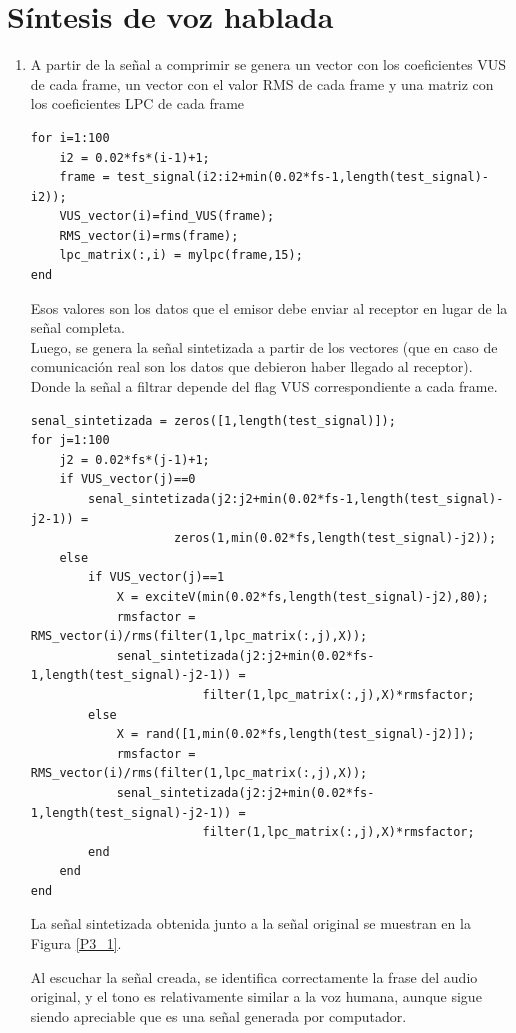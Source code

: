 \documentclass[letterpaper,onecolumn,10pt,journal,final]{IEEEtran}
\begin{document}
\section{Síntesis de voz hablada}
\begin{enumerate}[1)]
    \item %
A partir de la señal a comprimir se genera un vector con los coeficientes VUS de cada frame, un vector con el valor RMS de cada frame y una matriz con los coeficientes LPC de cada frame
\begin{lstlisting}
for i=1:100
    i2 = 0.02*fs*(i-1)+1;
    frame = test_signal(i2:i2+min(0.02*fs-1,length(test_signal)-i2));
    VUS_vector(i)=find_VUS(frame);
    RMS_vector(i)=rms(frame);
    lpc_matrix(:,i) = mylpc(frame,15);
end
\end{lstlisting}
Esos valores son los datos que el emisor debe enviar al receptor en lugar de la señal completa. \\

Luego, se genera la señal sintetizada a partir de los vectores (que en caso de comunicación real son los datos que debieron haber llegado al receptor). Donde la señal a filtrar depende del flag VUS correspondiente a cada frame.

\begin{lstlisting}
senal_sintetizada = zeros([1,length(test_signal)]);
for j=1:100
    j2 = 0.02*fs*(j-1)+1;
    if VUS_vector(j)==0
        senal_sintetizada(j2:j2+min(0.02*fs-1,length(test_signal)-j2-1)) =
                    zeros(1,min(0.02*fs,length(test_signal)-j2));
    else
        if VUS_vector(j)==1
            X = exciteV(min(0.02*fs,length(test_signal)-j2),80);
            rmsfactor = RMS_vector(i)/rms(filter(1,lpc_matrix(:,j),X));
            senal_sintetizada(j2:j2+min(0.02*fs-1,length(test_signal)-j2-1)) =
                        filter(1,lpc_matrix(:,j),X)*rmsfactor;
        else
            X = rand([1,min(0.02*fs,length(test_signal)-j2)]);
            rmsfactor = RMS_vector(i)/rms(filter(1,lpc_matrix(:,j),X));
            senal_sintetizada(j2:j2+min(0.02*fs-1,length(test_signal)-j2-1)) =
                        filter(1,lpc_matrix(:,j),X)*rmsfactor;
        end
    end
end
\end{lstlisting}

La señal sintetizada obtenida junto a la señal original se muestran en la Figura \ref{P3_1}.

Al escuchar la señal creada, se identifica correctamente la frase del audio original, y el tono es relativamente similar a la voz humana, aunque sigue siendo apreciable que es una señal generada por computador. \\


\end{enumerate}
\end{document}
